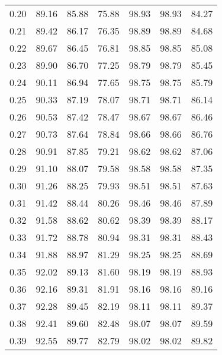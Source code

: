 \begin{tabular}{|c|c|c|c|c|c|c|}
      0.20 &     89.16 &     85.88 &      75.88 &   98.93 &      98.93 &         84.27 \\
      0.21 &     89.42 &     86.17 &      76.35 &   98.89 &      98.89 &         84.68 \\
      0.22 &     89.67 &     86.45 &      76.81 &   98.85 &      98.85 &         85.08 \\
      0.23 &     89.90 &     86.70 &      77.25 &   98.79 &      98.79 &         85.45 \\
      0.24 &     90.11 &     86.94 &      77.65 &   98.75 &      98.75 &         85.79 \\
      0.25 &     90.33 &     87.19 &      78.07 &   98.71 &      98.71 &         86.14 \\
      0.26 &     90.53 &     87.42 &      78.47 &   98.67 &      98.67 &         86.46 \\
      0.27 &     90.73 &     87.64 &      78.84 &   98.66 &      98.66 &         86.76 \\
      0.28 &     90.91 &     87.85 &      79.21 &   98.62 &      98.62 &         87.06 \\
      0.29 &     91.10 &     88.07 &      79.58 &   98.58 &      98.58 &         87.35 \\
      0.30 &     91.26 &     88.25 &      79.93 &   98.51 &      98.51 &         87.63 \\
      0.31 &     91.42 &     88.44 &      80.26 &   98.46 &      98.46 &         87.89 \\
      0.32 &     91.58 &     88.62 &      80.62 &   98.39 &      98.39 &         88.17 \\
      0.33 &     91.72 &     88.78 &      80.94 &   98.31 &      98.31 &         88.43 \\
      0.34 &     91.88 &     88.97 &      81.29 &   98.25 &      98.25 &         88.69 \\
      0.35 &     92.02 &     89.13 &      81.60 &   98.19 &      98.19 &         88.93 \\
      0.36 &     92.16 &     89.31 &      81.91 &   98.16 &      98.16 &         89.16 \\
      0.37 &     92.28 &     89.45 &      82.19 &   98.11 &      98.11 &         89.37 \\
      0.38 &     92.41 &     89.60 &      82.48 &   98.07 &      98.07 &         89.59 \\
      0.39 &     92.55 &     89.77 &      82.79 &   98.02 &      98.02 &         89.82 \\

\end{tabular}
